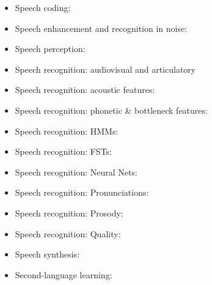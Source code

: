 \documentclass{article}
\begin{document}
\begin{itemize}
\item Speech coding:~\cite{Conway82,Schroeder85,Lamblin89}
\item Speech enhancement and recognition in noise:~\cite{Cooke01b,Ephraim85,Gales96,Martin01,Nadas89}
\item Speech perception:~\cite{Chistovich85,Cooper88,Delattre55,Fowler91,Hickok07,Iverson95,Lotto98,Miller55,Whalen89}
\item Speech recognition: audiovisual and articulatory~\cite{Chu00,Jackson88b,Neti00,Wrench00b}
\item Speech recognition: acoustic features:~\cite{Davis80,Ghitza97,Halberstadt98b,Hermansky90,Hermansky94,Hermansky99}
\item Speech recognition: phonetic \& bottleneck features:~\cite{AbdelattyAli01a,AbdelattyAli01b,Jansen07,Kirchhoff98,Liu96,Loizou95,Niyogi99,Sonderegger12,Vesely2012}
\item Speech recognition: HMMs:~\cite{Rabiner86a,Gales98,Gauvain94,Juang86,Juang1990,Odell94,Povey02,Povey09}
\item Speech recognition: FSTs:~\cite{Mangu00,Mohri02,Oerder93}
\item Speech recognition: Neural Nets:~\cite{Bengio92a,Chan2016,Graves2006,Graves13,Hermansky2000,Jaakkola99,Vesely13interspeech,Waibel89a}
\item Speech recognition: Pronunciations:~\cite{FoslerLussier99a,Kanthak02,Ko2014,Livescu04b,Schultz2001,Sethy02,Vu2012}
\item Speech recognition: Prosody:~\cite{Chen04d,Hirschberg04b,Ostendorf03,Stolcke99}
\item Speech recognition: Quality:~\cite{Gillick89,Hazen02b}
\item Speech synthesis:~\cite{Black2006,Fant86,Fujisaki84,Fukada1992,Klatt76,Klatt90,Maeda82,Tokuda2000,Yoshimura99,Yoshimura2001}
\item Second-language learning:~\cite{Best88,Bradlow97,Witt00}
  
\end{itemize}



\end{document}
